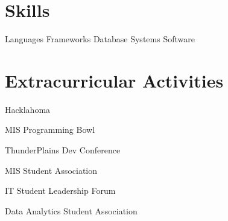 \documentclass[letterpaper]{resumeconfig}
\begin{document}

\section{Skills}

\begin{Skills}
	\SkillCategory
	{Languages}
	{
		    
	}
	\SkillCategory
	{Frameworks}
	{
		      
	}
	\SkillCategory
	{Database Systems}
	{
		   
	}
	\SkillCategory
	{Software}
	{
		     \skill{\LaTeX}
	}	
\end{Skills}
\vspace{-0.5em}


\section{Extracurricular Activities}

    \begin{ActivitiesList}
        \item Hacklahoma
        \item MIS Programming Bowl
        \item ThunderPlains Dev Conference
        \item MIS Student Association
        \item IT Student Leadership Forum
        \item Data Analytics Student Association
    \end{ActivitiesList}
\end{document}
